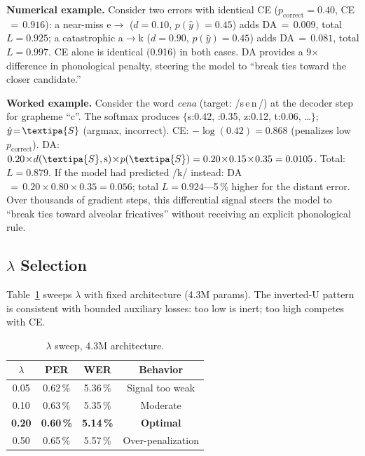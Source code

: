 \documentclass[conference]{IEEEtran}
\newcommand{\lam}{\lambda}                %
\begin{document}
\textbf{Numerical example.}
Consider two errors with identical CE ($p_\mathrm{correct}\!=\!0.40$,
CE$\,=\,0.916$):
a near-miss e$\to$ ($d\!=\!0.10$, $p(\hat{y})\!=\!0.45$)
adds DA$\,=\,0.009$, total $L\!=\!0.925$;
a catastrophic a$\to$k ($d\!=\!0.90$, $p(\hat{y})\!=\!0.45$) adds
DA$\,=\,0.081$, total $L\!=\!0.997$.
CE alone is identical (0.916) in both cases.
DA provides a 9$\times$ difference in phonological penalty, steering
the model to ``break ties toward the closer candidate.''

\textbf{Worked example.}
Consider the word \textit{cena} (target: /s\,e\,n\,/)
at the decoder step for grapheme ``c''.
The softmax produces
$\{$s:0.42, :0.35, z:0.12, t:0.06, \ldots$\}$;
$\hat{y}\!=\!\textipa{S}$ (argmax, incorrect).
CE: $-\!\log(0.42)\!=\!0.868$ (penalizes low $p_\mathrm{correct}$).
DA: $0.20\!\times\!d(\textipa{S},\mathrm{s})\!\times\!p(\textipa{S})
     = 0.20\!\times\!0.15\!\times\!0.35 = 0.0105$.
Total: $L\!=\!0.879$.
If the model had predicted /k/ instead:
DA$\,=\,0.20\!\times\!0.80\!\times\!0.35 = 0.056$;
total $L\!=\!0.924$---5\,\% higher for the distant error.
Over thousands of gradient steps, this differential signal steers
the model to ``break ties toward alveolar fricatives'' without
receiving an explicit phonological rule.

\subsection{$\lambda$ Selection}

Table~\ref{tab:lambda} sweeps $\lam$ with fixed architecture
(4.3M params).
The inverted-U pattern is consistent with bounded auxiliary losses:
too low is inert; too high competes with CE.
\begin{table}[ht]
  \caption{$\lambda$ sweep, 4.3M architecture.}
  \label{tab:lambda}
  \centering\small
  \begin{tabular}{cccc}
    \toprule
    $\lambda$ & PER & WER & Behavior \\
    \midrule
    0.05 & 0.62\,\% & 5.36\,\% & Signal too weak \\
    0.10 & 0.63\,\% & 5.35\,\% & Moderate \\
    \textbf{0.20} & \textbf{0.60\,\%} & \textbf{5.14\,\%} & \textbf{Optimal} \\
    0.50 & 0.65\,\% & 5.57\,\% & Over-penalization \\
    \bottomrule
  \end{tabular}
\end{table}
\end{document}
